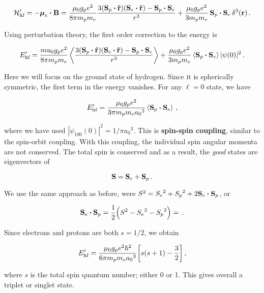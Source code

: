 \documentclass[12pt, titlepage]{article}
\newcommand{\exv}[1]{\left\langle #1 \right\rangle}
\begin{document}
\begin{equation}
\mathcal{H}_\text{hf}^\prime = -\vb*{\mu}_e\vdot\vb{B} = \frac{\mu_0g_pe^2}{8\pi m_p m_e}\frac{3(\vb{S}_p\vdot\vu{r})(\vb{S}_e\vdot\vu{r})-\vb{S}_p\vdot\vb{S}_e}{r^3} + \frac{\mu_0g_pe^2}{3m_p m_e}\,\vb{S}_p\vdot\vb{S}_e\,\delta^3(\vb{r}) \,.
\end{equation}

Using perturbation theory, the first order correction to the energy is

\begin{equation}
E_\text{hf}^\prime = \frac{mu_0g_pe^2}{8\pi m_p m_e}\exv{\frac{3(\vb{S}_p\vdot\vu{r})(\vb{S}_e\vdot\vu{r})-\vb{S}_p\vdot\vb{S}_e}{r^3}} + \frac{\mu_0 g_p e^2}{3 m_p m_e}\exv{\vb{S}_p\vdot\vb{S}_e}|\psi(0)|^2 \,.
\end{equation}

Here we will focus on the ground state of hydrogen. Since it is spherically symmetric, the first term in the energy vanishes. For any $\ell = 0$ state, we have 

\begin{equation*}
E_\text{hf}^\prime = \frac{\mu_0 g_p e^2}{3\pi m_p m_e {a_0}^3}\exv{\vb{S}_p\vdot\vb{S}_e} \,,
\end{equation*}

where we have used $|\psi_{100}(0)|^2 = 1/\pi{a_0}^3$. This is \textbf{spin-spin coupling}, similar to the spin-orbit coupling. With this coupling, the individual spin angular momenta are not conserved. The total spin is conserved and as a result, the \textit{good} states are eigenvectors of 

\begin{equation}
\vb{S} = \vb{S}_e + \vb{S}_p \,.
\end{equation}

We use the same approach as before, were $S^2 = {S_e}^2 + {S_p}^2 + 2\vb{S}_e\vdot\vb{S}_p$, or

\begin{equation}
\vb{S}_e\vdot\vb{S}_p = \frac{1}{2}\Bigl(S^2 - {S_e}^2 - {S_p}^2 \Bigr) = \,.
\end{equation}

Since electrons and protons are both $s=1/2$, we obtain

\begin{equation*}
E_\text{hf}^\prime = \frac{\mu_0 g_p e^2\hbar^2}{6\pi m_p m_e {a_0}^3}\qty[s(s+1) - \frac{3}{2}] \,,
\end{equation*}

where $s$ is the total spin quantum number; either 0 or 1. This gives overall a triplet or singlet state.
\end{document}
